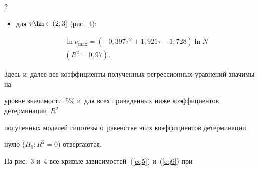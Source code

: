 \begin{multicols}{2}
\begin{itemize}
\noindent


\begin{multline}


\label{eq5}


\ln\nu_{\max} = 0{,}205\ln N + 0{,}941\tau^2 - 1{,}013 \\


\left(R^2=0{,}95\right);


\end{multline}





\item для $\tau\hm\in(2,3]$ (рис.~4):





\vspace*{-2pt}





\noindent


\begin{multline}


\label{eq6}


\ln\nu_{\max} = \left(-0{,}397\tau^2+1{,}921\tau-1{,}728\right)\ln N \\ 


\left(R^2=0{,}97\right).


\end{multline}


\end{itemize}





\vspace*{-2pt}





\noindent


Здесь и~далее все коэффициенты полученных регрессионных уравнений значимы на 


уровне значимости~5\% и~для всех приведенных ниже коэффициентов детерминации~$R^2$ 


полученных моделей гипотезы о~равенстве этих коэффициентов детерминации 


нулю ($H_0: R^2=0$) отвергаются.














На рис.~3 и~4 все кривые зависимостей~(\ref{eq5}) и~(\ref{eq6}) при 



\end{multicols}
